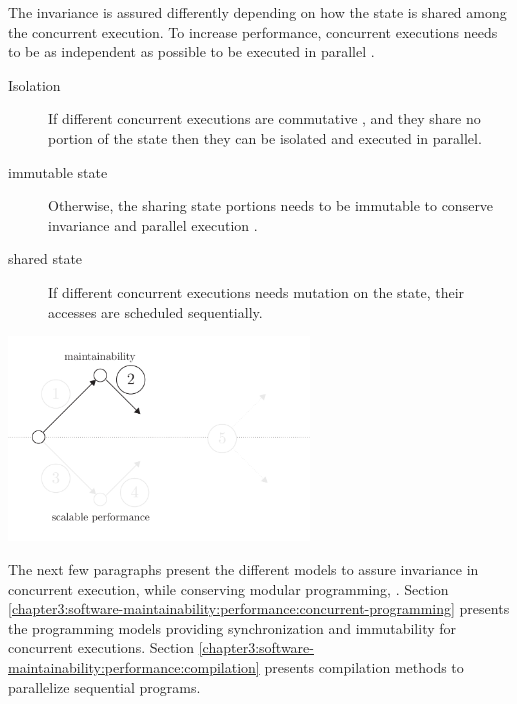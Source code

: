 The invariance is assured differently depending on how the state is shared among the concurrent execution.
To increase performance, concurrent executions needs to be as independent as possible to be executed in parallel .
\begin{description}
  \item[Isolation] If different concurrent executions are commutative \cite{Rinard1996,Clements2013a}, and they share no portion of the state then they can be isolated and executed in parallel.
  \item[immutable state] Otherwise, the sharing state portions needs to be immutable to conserve invariance and parallel execution \cite{Gordon2012,Matsakis2012a}.
  \item[shared state] If different concurrent executions needs mutation on the state, their accesses are scheduled sequentially.
\end{description}

\begin{center}
\includegraphics[width=0.6\textwidth]{../ressources/state-of-the-art-2.pdf}
\end{center}

The next few paragraphs present the different models to assure invariance in concurrent execution, while conserving modular programming, .
Section \ref{chapter3:software-maintainability:performance:concurrent-programming} presents the programming models providing synchronization and immutability for concurrent executions.
Section \ref{chapter3:software-maintainability:performance:compilation} presents compilation methods to parallelize sequential programs.




